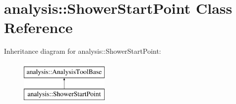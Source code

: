 \hypertarget{classanalysis_1_1ShowerStartPoint}{\section{analysis\-:\-:Shower\-Start\-Point Class Reference}
\label{classanalysis_1_1ShowerStartPoint}
}
Inheritance diagram for analysis\-:\-:Shower\-Start\-Point\-:\begin{figure}[H]
\begin{center}
\leavevmode
\includegraphics[height=2.000000cm]{classanalysis_1_1ShowerStartPoint}
\end{center}
\end{figure}
